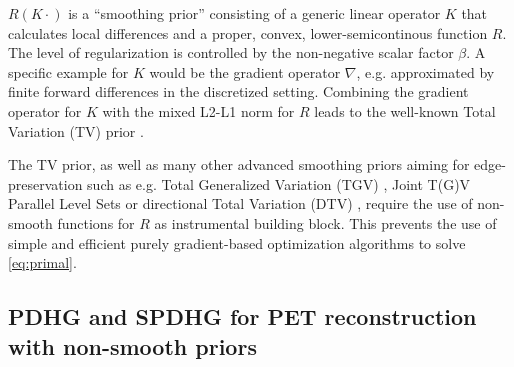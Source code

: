 $R(K\cdot)$ is a ``smoothing prior'' consisting of a generic linear operator $K$ that calculates 
local differences and a proper, convex, lower-semicontinous function $R$.
The level of regularization is controlled by the non-negative scalar factor $\beta$.
A specific example for $K$ would be the gradient operator $\nabla$, e.g. approximated by finite forward 
differences in the discretized setting.
Combining the gradient operator for $K$ with the mixed L2-L1 norm for $R$ leads to the well-known 
Total Variation (TV) prior \cite{Rudin1992}.

The TV prior, as well as many other advanced smoothing priors aiming for edge-preservation 
such as e.g. Total Generalized Variation (TGV) 
\cite{Bredies2010}, Joint T(G)V \cite{Rigie2015,Knoll2016}
Parallel Level Sets \cite{Ehrhardt2016a,Schramm2017} or directional Total Variation (DTV)
\cite{Ehrhardt2016}, require the use of non-smooth functions for $R$ as instrumental building block.
This prevents the use of simple and efficient 
purely gradient-based optimization algorithms to solve \eqref{eq:primal}.

\subsection*{PDHG and SPDHG for PET reconstruction with non-smooth priors}

